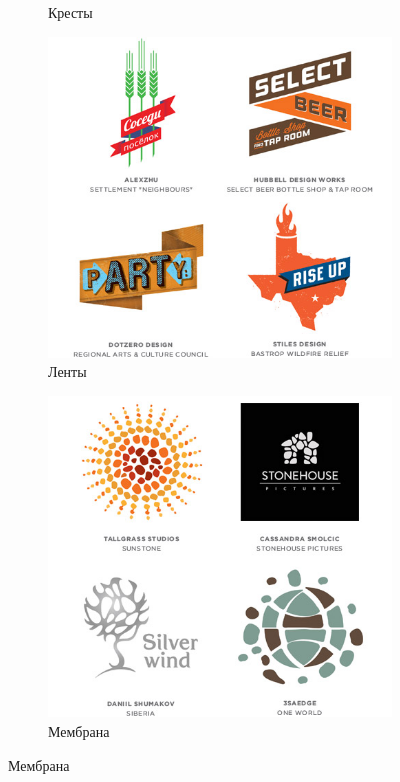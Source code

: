 \begin{figure}[h!]
\begin{subfigure}{.45\textwidth}
    \caption[]{Кресты}
    \label{fig:logolounge:2013:kresti}
  \end{subfigure}
  \vfill
  \centering
  \begin{subfigure}{.45\textwidth}
    \centering
    \includegraphics[width=\linewidth]{images/supplement/logolounge/2013/Lenti}
    \caption[]{Ленты}
    \label{fig:logolounge:2013:lenti}
  \end{subfigure}
  \hfill
  \centering
  \begin{subfigure}{.45\textwidth}
    \centering
    \includegraphics[width=\linewidth]{images/supplement/logolounge/2013/Membrana}
    \caption[]{Мембрана}
    \label{fig:logolounge:2013:membrana}
  \end{subfigure}
\end{figure}

